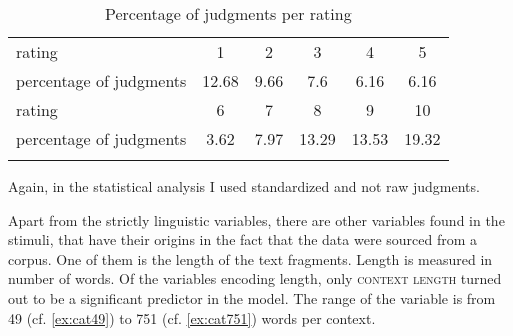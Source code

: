 \begin{table}
\begin{tabular}{l c c c c c}
\lsptoprule
		rating & 1& 2& 3& 4& 5 \\
		percentage of judgments & 12.68 & 9.66 & 7.6&  6.16 &  6.16 \\
	\midrule
			rating& 6 & 7 & 8 & 9& 10\\
		percentage of judgments  &3.62&7.97&13.29&13.53&19.32\\
		
\lspbottomrule
	\end{tabular}
	\caption{Percentage of judgments per rating\label{tab:judgcatepev}}
\end{table}


Again, in the statistical analysis I used standardized and not raw judgments.

Apart from the strictly linguistic variables, there are other variables found in the stimuli, that have their origins in the fact that the data were sourced from a corpus. One of them is the length of the text fragments. Length is  measured in number of words. Of the variables encoding length, only \textsc{context length} turned out to be a significant predictor in the model. The range of the variable is from 49 (cf. \ref{ex:cat49}) to 751 (cf. \ref{ex:cat751}) words per context.



